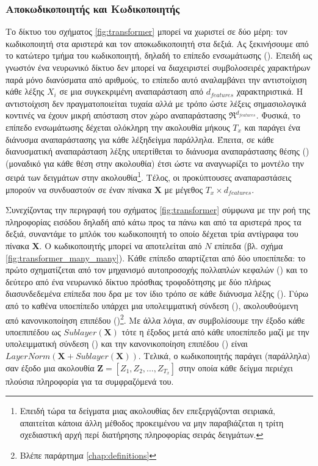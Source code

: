 \subsubsection{Αποκωδικοποιητής και Κωδικοποιητής}
Το δίκτυο του σχήματος \ref{fig:transformer} μπορεί να χωριστεί σε δύο μέρη: τον κωδικοποιητή στα αριστερά και τον αποκωδικοποιητή στα δεξιά. Ας ξεκινήσουμε από το κατώτερο τμήμα του κωδικοποιητή, δηλαδή το επίπεδο ενσωμάτωσης (). Επειδή ως γνωστόν ένα νευρωνικό δίκτυο δεν μπορεί να διαχειριστεί συμβολοσειρές χαρακτήρων παρά μόνο διανύσματα από αριθμούς, το επίπεδο αυτό αναλαμβάνει την αντιστοίχιση κάθε λέξης $X_i$ σε μια συγκεκριμένη αναπαράσταση από $d_{features}$ χαρακτηριστικά. Η αντιστοίχιση δεν πραγματοποιείται τυχαία αλλά με τρόπο ώστε λέξεις σημασιολογικά κοντινές να έχουν μικρή απόσταση στον χώρο αναπαράστασης $\Re^{d_{features}}$. Φυσικά, το επίπεδο ενσωμάτωσης δέχεται ολόκληρη την ακολουθία μήκους $T_x$ και παράγει ένα διάνυσμα αναπαράστασης για κάθε λέξη\textemdash δείγμα παράλληλα. Έπειτα, σε κάθε διανυσματική αναπαράσταση λέξης υπερτίθεται το διάνυσμα αναπαράστασης θέσης () (μοναδικό για κάθε θέση στην ακολουθία) έτσι ώστε να αναγνωρίζει το μοντέλο την σειρά των δειγμάτων στην ακολουθία\footnote{Επειδή τώρα τα δείγματα μιας ακολουθίας δεν επεξεργάζονται σειριακά, απαιτείται κάποια άλλη μέθοδος προκειμένου να μην παραβιάζεται η τρίτη σχεδιαστική αρχή περί διατήρησης πληροφορίας σειράς δειγμάτων.}. Τέλος, οι προκύπτουσες αναπαραστάσεις μπορούν να συνδυαστούν σε έναν πίνακα $\boldsymbol{X}$ με μέγεθος $T_x \times d_{features}$.\par

Συνεχίζοντας την περιγραφή του σχήματος \ref{fig:transformer} σύμφωνα με την ροή της πληροφορίας εισόδου δηλαδή από κάτω προς τα πάνω και από τα αριστερά προς τα δεξιά, συναντάμε το μπλόκ του κωδικοποιητή το οποίο δέχεται τρία αντίγραφα του πίνακα $\boldsymbol{X}$. Ο κωδικοποιητής μπορεί να αποτελείται από $N$ επίπεδα (βλ. σχήμα \ref{fig:transformer_many_many}). Κάθε επίπεδο απαρτίζεται από δύο υπο\textendash επίπεδα: το πρώτο σχηματίζεται από τον μηχανισμό αυτο\textendash προσοχής πολλαπλών κεφαλών () και το δεύτερο από ένα νευρωνικό δίκτυο πρόσθιας τροφοδότησης με δύο πλήρως διασυνδεδεμένα επίπεδα που δρα με τον ίδιο τρόπο σε κάθε διάνυσμα λέξης (). Γύρω από το καθένα υποεπίπεδο υπάρχει μια υπολειμματική σύνδεση (), ακολουθούμενη από κανονικοποίηση επιπέδου ()\footnote{Βλέπε παράρτημα \ref{chap:definitions}}. Με άλλα λόγια, αν συμβολίσουμε την έξοδο κάθε υπο\textendash επιπέδου ως $Sublayer(\boldsymbol{X})$ τότε η έξοδος μετά από κάθε υποεπίπεδο μαζί με την υπολειμματική σύνδεση () και την κανονικοποίηση επιπέδου () είναι $LayerNorm(\boldsymbol{X} + Sublayer(\boldsymbol{X}))$. Τελικά, ο κωδικοποιητής παράγει (παράλληλα) σαν έξοδο μια ακολουθία $\boldsymbol{Z} = [Z_1, Z_2, \dots, Z_{T_x}]$ στην οποία κάθε δείγμα περιέχει πλούσια πληροφορία για τα συμφραζόμενά του.\par

